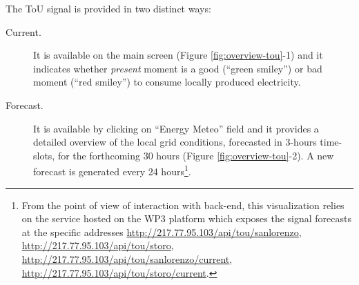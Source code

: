 The ToU signal is provided in two distinct ways:
\begin{description}
 \item[Current.] It is available on the main screen (Figure \ref{fig:overview-tou}-1) and it indicates whether \textit{present} moment is a good (``green smiley'') or bad moment (``red smiley'')
 to consume locally produced electricity.
 \item[Forecast.] It is available by clicking on ``Energy Meteo'' field and it provides a detailed overview of the local grid conditions, forecasted in 3-hours time-slots, for the forthcoming 30 hours (Figure \ref{fig:overview-tou}-2). A new forecast is generated every 24 hours\footnote{From the point of view of interaction with back-end, this visualization relies on the
 service hosted on the WP3 platform which exposes the signal forecasts at the specific addresses \url{http://217.77.95.103/api/tou/sanlorenzo}, \url{http://217.77.95.103/api/tou/storo},
 \url{http://217.77.95.103/api/tou/sanlorenzo/current}, \url{http://217.77.95.103/api/tou/storo/current}.}.
\end{description}



